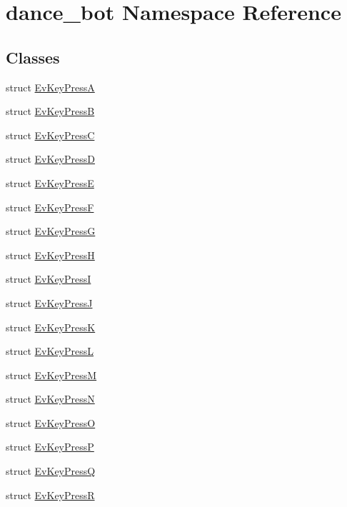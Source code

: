 \hypertarget{namespacedance__bot}{}\section{dance\+\_\+bot Namespace Reference}
\label{namespacedance__bot}
\subsection*{Classes}
\begin{DoxyCompactItemize}
\item 
struct \hyperlink{structdance__bot_1_1EvKeyPressA}{Ev\+Key\+PressA}
\item 
struct \hyperlink{structdance__bot_1_1EvKeyPressB}{Ev\+Key\+PressB}
\item 
struct \hyperlink{structdance__bot_1_1EvKeyPressC}{Ev\+Key\+PressC}
\item 
struct \hyperlink{structdance__bot_1_1EvKeyPressD}{Ev\+Key\+PressD}
\item 
struct \hyperlink{structdance__bot_1_1EvKeyPressE}{Ev\+Key\+PressE}
\item 
struct \hyperlink{structdance__bot_1_1EvKeyPressF}{Ev\+Key\+PressF}
\item 
struct \hyperlink{structdance__bot_1_1EvKeyPressG}{Ev\+Key\+PressG}
\item 
struct \hyperlink{structdance__bot_1_1EvKeyPressH}{Ev\+Key\+PressH}
\item 
struct \hyperlink{structdance__bot_1_1EvKeyPressI}{Ev\+Key\+PressI}
\item 
struct \hyperlink{structdance__bot_1_1EvKeyPressJ}{Ev\+Key\+PressJ}
\item 
struct \hyperlink{structdance__bot_1_1EvKeyPressK}{Ev\+Key\+PressK}
\item 
struct \hyperlink{structdance__bot_1_1EvKeyPressL}{Ev\+Key\+PressL}
\item 
struct \hyperlink{structdance__bot_1_1EvKeyPressM}{Ev\+Key\+PressM}
\item 
struct \hyperlink{structdance__bot_1_1EvKeyPressN}{Ev\+Key\+PressN}
\item 
struct \hyperlink{structdance__bot_1_1EvKeyPressO}{Ev\+Key\+PressO}
\item 
struct \hyperlink{structdance__bot_1_1EvKeyPressP}{Ev\+Key\+PressP}
\item 
struct \hyperlink{structdance__bot_1_1EvKeyPressQ}{Ev\+Key\+PressQ}
\item 
struct \hyperlink{structdance__bot_1_1EvKeyPressR}{Ev\+Key\+PressR}

\end{DoxyCompactItemize}
